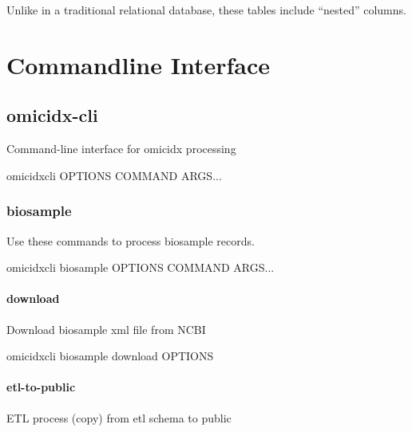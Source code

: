 \documentclass[letterpaper,10pt,english]{sphinxmanual}
\begin{document}
Unlike in a traditional relational database, these tables include
“nested” columns.


\section{Commandline Interface}
\label{\detokenize{cli:commandline-interface}}\label{\detokenize{cli::doc}}

\subsection{omicidx-cli}
\label{\detokenize{cli:omicidx-cli}}
Command-line interface for omicidx processing

\begin{sphinxVerbatim}[commandchars=\\\{\}]
omicidx\PYGZhy{}cli \PYG{o}{[}OPTIONS\PYG{o}{]} COMMAND \PYG{o}{[}ARGS\PYG{o}{]}...
\end{sphinxVerbatim}


\subsubsection{biosample}
\label{\detokenize{cli:omicidx-cli-biosample}}
Use these commands to process biosample records.

\begin{sphinxVerbatim}[commandchars=\\\{\}]
omicidx\PYGZhy{}cli biosample \PYG{o}{[}OPTIONS\PYG{o}{]} COMMAND \PYG{o}{[}ARGS\PYG{o}{]}...
\end{sphinxVerbatim}


\paragraph{download}
\label{\detokenize{cli:omicidx-cli-biosample-download}}
Download biosample xml file from NCBI

\begin{sphinxVerbatim}[commandchars=\\\{\}]
omicidx\PYGZhy{}cli biosample download \PYG{o}{[}OPTIONS\PYG{o}{]}
\end{sphinxVerbatim}


\paragraph{etl-to-public}
\label{\detokenize{cli:omicidx-cli-biosample-etl-to-public}}
ETL process (copy) from etl schema to public
\end{document}
